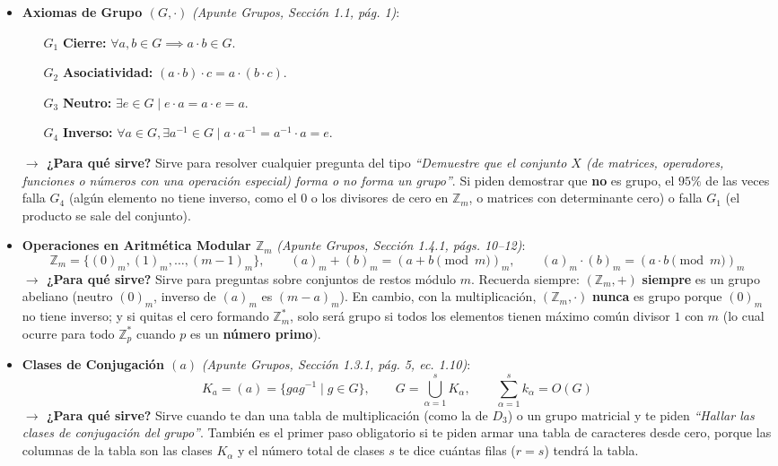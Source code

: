 \documentclass[11pt, a4paper]{article}
\begin{document}
\begin{itemize}
    \item \textbf{Axiomas de Grupo $(G, \cdot)$} \textit{(Apunte Grupos, Sección 1.1, pág. 1)}:
    \begin{enumerate}
        \item[$G_1$] \textbf{Cierre:} $\forall a, b \in G \implies a \cdot b \in G$.
        \item[$G_2$] \textbf{Asociatividad:} $(a \cdot b) \cdot c = a \cdot (b \cdot c)$.
        \item[$G_3$] \textbf{Neutro:} $\exists e \in G \mid e \cdot a = a \cdot e = a$.
        \item[$G_4$] \textbf{Inverso:} $\forall a \in G, \exists a^{-1} \in G \mid a \cdot a^{-1} = a^{-1} \cdot a = e$.
    \end{enumerate}
    \textbf{$\rightarrow$ ¿Para qué sirve?} Sirve para resolver cualquier pregunta del tipo \textit{``Demuestre que el conjunto $X$ (de matrices, operadores, funciones o números con una operación especial) forma o no forma un grupo''}. Si piden demostrar que \textbf{no} es grupo, el $95\%$ de las veces falla $G_4$ (algún elemento no tiene inverso, como el $0$ o los divisores de cero en $\mathbb{Z}_m$, o matrices con determinante cero) o falla $G_1$ (el producto se sale del conjunto).

    \item \textbf{Operaciones en Aritmética Modular $\mathbb{Z}_m$} \textit{(Apunte Grupos, Sección 1.4.1, págs. 10--12)}:
    \[
    \mathbb{Z}_m = \{(0)_m, (1)_m, \dots, (m-1)_m\}, \qquad (a)_m + (b)_m = (a + b \pmod m)_m, \qquad (a)_m \cdot (b)_m = (a \cdot b \pmod m)_m
    \]
    \textbf{$\rightarrow$ ¿Para qué sirve?} Sirve para preguntas sobre conjuntos de restos módulo $m$. Recuerda siempre: $(\mathbb{Z}_m, +)$ \textbf{siempre} es un grupo abeliano (neutro $(0)_m$, inverso de $(a)_m$ es $(m-a)_m$). En cambio, con la multiplicación, $(\mathbb{Z}_m, \cdot)$ \textbf{nunca} es grupo porque $(0)_m$ no tiene inverso; y si quitas el cero formando $\mathbb{Z}_m^*$, solo será grupo si todos los elementos tienen máximo común divisor $1$ con $m$ (lo cual ocurre para todo $\mathbb{Z}_p^*$ cuando $p$ es un \textbf{número primo}).

    \item \textbf{Clases de Conjugación $(a)$} \textit{(Apunte Grupos, Sección 1.3.1, pág. 5, ec. 1.10)}:
    \[
    K_a = (a) = \big\{ gag^{-1} \;\big|\; g \in G \big\}, \qquad G = \bigcup_{\alpha=1}^s K_\alpha, \qquad \sum_{\alpha=1}^s k_\alpha = O(G)
    \]
    \textbf{$\rightarrow$ ¿Para qué sirve?} Sirve cuando te dan una tabla de multiplicación (como la de $D_3$) o un grupo matricial y te piden \textit{``Hallar las clases de conjugación del grupo''}. También es el primer paso obligatorio si te piden armar una tabla de caracteres desde cero, porque las columnas de la tabla son las clases $K_\alpha$ y el número total de clases $s$ te dice cuántas filas ($r=s$) tendrá la tabla.


\end{itemize}
\end{document}
